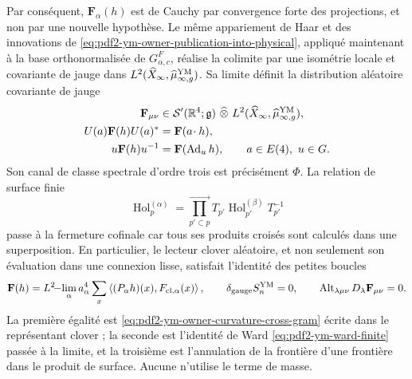 Par conséquent, $\mathbf F_\alpha(h)$ est de Cauchy par convergence forte des projections,
et non par une nouvelle hypothèse. Le même appariement de Haar et des innovations de
\eqref{eq:pdf2-ym-owner-publication-into-physical}, appliqué maintenant à la base
orthonormalisée de $G_{\alpha,c}^{F}$, réalise la colimite par une isométrie
locale et covariante de jauge dans
$L^2(\widehat X_\infty,\widehat\mu_{\infty,g}^{\rm YM})$. Sa limite définit la
distribution aléatoire
covariante de jauge
\begin{equation}\label{eq:pdf2-ym-owner-distributional-curvature}
\begin{aligned}
 \mathbf F_{\mu\nu}&\in
 \mathcal S'(\mathbb R^4;\mathfrak g)\ \widehat\otimes\
 L^2(\widehat X_\infty,\widehat\mu_{\infty,g}^{\rm YM}),\\
 U(a)\mathbf F(h)U(a)^*&=\mathbf F(a\!\cdot h),\\
 u\mathbf F(h)u^{-1}&=\mathbf F(\operatorname{Ad}_u h),
 \qquad a\in E(4),\ u\in G.
\end{aligned}
\end{equation}
Son canal de classe spectrale d'ordre trois est précisément $\Phi$. La relation de surface finie
\begin{equation}\label{eq:pdf2-ym-owner-surface-product}
 \operatorname{Hol}^{(\alpha)}_p
 =\prod_{p'\subset p}^{\longrightarrow}
  T_{p'}\operatorname{Hol}^{(\beta)}_{p'}T_{p'}^{-1}
\end{equation}
passe à la fermeture cofinale car tous ses produits croisés sont calculés dans une
superposition. En particulier, le lecteur clover aléatoire, et non seulement son évaluation dans une
connexion lisse, satisfait l’identité des petites boucles
\begin{equation}\label{eq:pdf2-ym-owner-holonomy-curvature-relation}
 \mathbf F(h)=L^2\!\mathord{-}\!\lim_{\alpha}
 a_\alpha^4\sum_x
 \left\langle(P_\alpha h)(x),F_{{\rm cl},\alpha}(x)\right\rangle,
 \qquad
 \delta_{\rm gauge}S_n^{\rm YM}=0,
 \qquad
 \operatorname{Alt}_{\lambda\mu\nu}D_\lambda\mathbf F_{\mu\nu}=0.
\end{equation}
La première égalité est \eqref{eq:pdf2-ym-owner-curvature-cross-gram} écrite dans le représentant clover ; la seconde est l'identité de Ward \eqref{eq:pdf2-ym-ward-finite} passée à la limite, et la troisième est l'annulation de la frontière d'une frontière dans le produit de surface. Aucune n'utilise le terme de masse.

